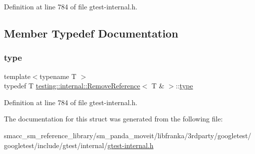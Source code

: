 Definition at line 784 of file gtest-\/internal.\+h.



\subsection{Member Typedef Documentation}
\mbox{\label{structtesting_1_1internal_1_1RemoveReference_3_01T_01_6_01_4_a3d0f32a66759f333c2dd66aa31005e6d}} 
\subsubsection{\texorpdfstring{type}{type}}
{\footnotesize\ttfamily template$<$typename T $>$ \\
typedef T \hyperlink{structtesting_1_1internal_1_1RemoveReference}{testing\+::internal\+::\+Remove\+Reference}$<$ T \& $>$\+::\hyperlink{structtesting_1_1internal_1_1RemoveReference_3_01T_01_6_01_4_a3d0f32a66759f333c2dd66aa31005e6d}{type}}



Definition at line 784 of file gtest-\/internal.\+h.



The documentation for this struct was generated from the following file\+:\begin{DoxyCompactItemize}
\item 
smacc\+\_\+sm\+\_\+reference\+\_\+library/sm\+\_\+panda\+\_\+moveit/libfranka/3rdparty/googletest/googletest/include/gtest/internal/\hyperlink{gtest-internal_8h}{gtest-\/internal.\+h}\end{DoxyCompactItemize}
